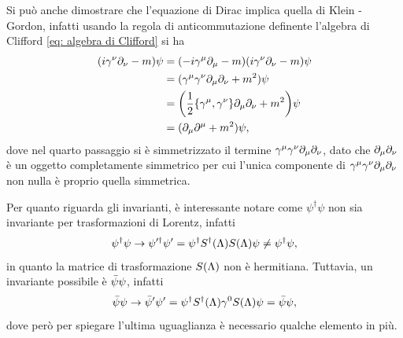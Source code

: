 Si può anche dimostrare che l'equazione di Dirac implica quella di Klein - Gordon, infatti usando la regola di anticommutazione definente l'algebra di Clifford \eqref{eq: algebra di Clifford} si ha
\begin{equation}
    \begin{split}
        (i\gamma^\nu \partial_\nu - m)\psi &= (-i\gamma^\mu\partial_\mu - m)(i\gamma^\nu\partial_\nu - m)\psi \\
        &=(\gamma^\mu\gamma^\nu\partial_\mu\partial_\nu + m^2)\psi \\
        &= \bigg(\frac{1}{2}\{\gamma^\mu,\gamma^\nu\}\partial_\mu\partial_\nu + m^2\bigg)\psi \\
        &=(\partial_\mu\partial^\mu + m^2)\psi, \\
    \end{split}
\end{equation}
dove nel quarto passaggio si è simmetrizzato il termine $\gamma^\mu\gamma^\nu\partial_\mu\partial_\nu$, dato che $\partial_\mu\partial_\nu$ è un oggetto completamente simmetrico per cui l'unica componente di $\gamma^\mu\gamma^\nu\partial_\mu\partial_\nu$ non nulla è proprio quella simmetrica.

Per quanto riguarda gli invarianti, è interessante notare come $\psi^\dagger\psi$ non sia invariante per trasformazioni di Lorentz, infatti
\begin{equation}
    \psi^\dagger\psi\to\psi'^\dagger\psi' = \psi^\dagger S^\dagger(\Lambda)S(\Lambda)\psi \neq \psi^\dagger\psi,
\end{equation}
in quanto la matrice di trasformazione $S(\Lambda)$ non è hermitiana. Tuttavia, un invariante possibile è $\bar{\psi}\psi$, infatti
\begin{equation}
\label{eq_: psi bar * psi invariante}
    \bar{\psi}\psi\to\bar{\psi}'\psi' = \psi^\dagger S^\dagger(\Lambda)\gamma^0 S(\Lambda)\psi = \bar{\psi}\psi,
\end{equation}
dove però per spiegare l'ultima uguaglianza è necessario qualche elemento in più. 

